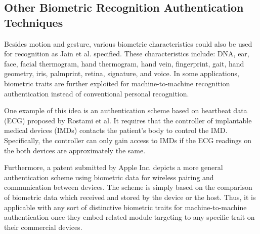 
\subsection{Other Biometric Recognition Authentication Techniques}

Besides motion and gesture, various biometric characteristics could also be used for recognition as Jain et al. \cite{Jain} specified. These characteristics include: DNA, ear, face, facial thermogram, hand thermogram, hand vein, fingerprint, gait, hand geometry, iris, palmprint, retina, signature, and voice. In some applications, biometric traits are further exploited for machine-to-machine recognition authentication instead of conventional personal recognition.

One example of this idea is an authentication scheme based on heartbeat data (ECG) proposed by Rostami et al.\cite{Rostami:2013} It requires that the controller of implantable medical devices (IMDs) contacts the patient's body to control the IMD. Specifically, the controller can only gain access to IMDs if the ECG readings on the both devices are approximately the same.  
 
Furthermore, a patent \cite{Apple:2014} submitted by Apple Inc. depicts a more general authentication scheme using biometric data for wireless pairing and communication between devices. The scheme is simply based on the comparison of biometric data which received and stored by the device or the host. Thus, it is applicable with any sort of distinctive biometric traits for machine-to-machine authentication once they embed related module targeting to any specific trait on their commercial devices.   